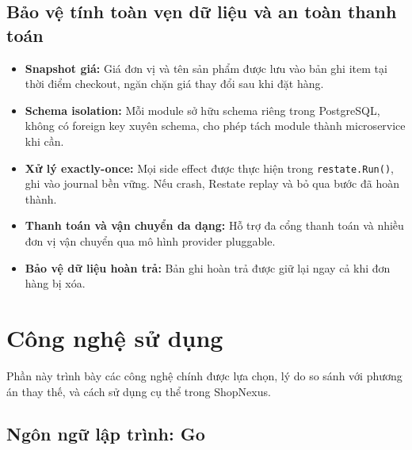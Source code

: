 \subsection{Bảo vệ tính toàn vẹn dữ liệu và an toàn thanh toán}

\begin{itemize}
    \item \textbf{Snapshot giá:} Giá đơn vị và tên sản phẩm được lưu vào bản ghi item tại thời điểm checkout, ngăn chặn giá thay đổi sau khi đặt hàng.
    \item \textbf{Schema isolation:} Mỗi module sở hữu schema riêng trong PostgreSQL, không có foreign key xuyên schema, cho phép tách module thành microservice khi cần.
    \item \textbf{Xử lý exactly-once:} Mọi side effect được thực hiện trong \texttt{restate.Run()}, ghi vào journal bền vững. Nếu crash, Restate replay và bỏ qua bước đã hoàn thành.
    \item \textbf{Thanh toán và vận chuyển da dạng:} Hỗ trợ đa cổng thanh toán và nhiều đơn vị vận chuyển qua mô hình provider pluggable.
    \item \textbf{Bảo vệ dữ liệu hoàn trả:} Bản ghi hoàn trả được giữ lại ngay cả khi đơn hàng bị xóa.
\end{itemize}

\section{Công nghệ sử dụng}

Phần này trình bày các công nghệ chính được lựa chọn, lý do so sánh với phương án thay thế, và cách sử dụng cụ thể trong ShopNexus.

\subsection{Ngôn ngữ lập trình: Go}

